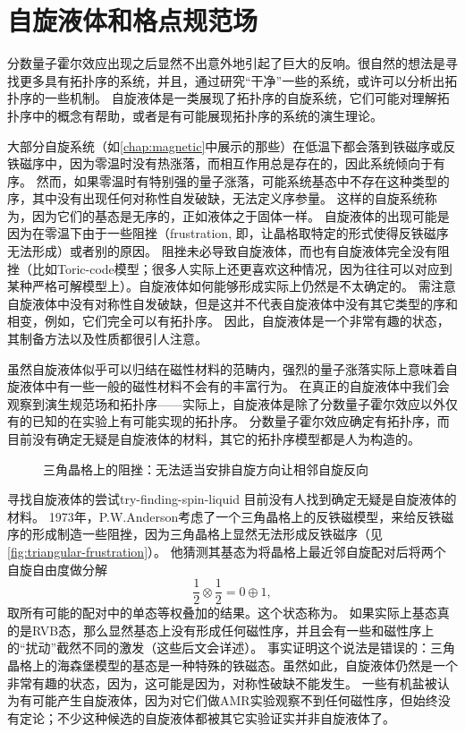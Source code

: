 \chapter{自旋液体和格点规范场}\label{chap:spin-liquid}

分数量子霍尔效应出现之后显然不出意外地引起了巨大的反响。很自然的想法是寻找更多具有拓扑序的系统，并且，通过研究“干净”一些的系统，或许可以分析出拓扑序的一些机制。
自旋液体是一类展现了拓扑序的自旋系统，它们可能对理解拓扑序中的概念有帮助，或者是有可能展现拓扑序的系统的演生理论。

大部分自旋系统（如\autoref{chap:magnetic}中展示的那些）在低温下都会落到铁磁序或反铁磁序中，因为零温时没有热涨落，而相互作用总是存在的，因此系统倾向于有序。
然而，如果零温时有特别强的量子涨落，可能系统基态中不存在这种类型的序，其中没有出现任何对称性自发破缺，无法定义序参量。
这样的自旋系统称为，因为它们的基态是无序的，正如液体之于固体一样。
自旋液体的出现可能是因为在零温下由于一些阻挫（frustration, 即，让晶格取特定的形式使得反铁磁序无法形成）或者别的原因。
阻挫未必导致自旋液体，而也有自旋液体完全没有阻挫（比如Toric-code模型；很多人实际上还更喜欢这种情况，因为往往可以对应到某种严格可解模型上）。自旋液体如何能够形成实际上仍然是不太确定的。
需注意自旋液体中没有对称性自发破缺，但是这并不代表自旋液体中没有其它类型的序和相变，例如，它们完全可以有拓扑序。
因此，自旋液体是一个非常有趣的状态，其制备方法以及性质都很引人注意。

虽然自旋液体似乎可以归结在磁性材料的范畴内，强烈的量子涨落实际上意味着自旋液体中有一些一般的磁性材料不会有的丰富行为。
在真正的自旋液体中我们会观察到演生规范场和拓扑序——实际上，自旋液体是除了分数量子霍尔效应以外仅有的已知的在实验上有可能实现的拓扑序。
分数量子霍尔效应确定有拓扑序，而目前没有确定无疑是自旋液体的材料，其它的拓扑序模型都是人为构造的。

\begin{figure}
    \centering
    
    \caption{三角晶格上的阻挫：无法适当安排自旋方向让相邻自旋反向}
    \label{fig:triangular-frustration}
\end{figure}

\begin{info}{寻找自旋液体的尝试}{try-finding-spin-liquid}
    目前没有人找到确定无疑是自旋液体的材料。
    1973年，P.W.Anderson考虑了一个三角晶格上的反铁磁模型，来给反铁磁序的形成制造一些阻挫，因为三角晶格上显然无法形成反铁磁序（见\autoref{fig:triangular-frustration}）。
    他猜测其基态为将晶格上最近邻自旋配对后将两个自旋自由度做分解
    \[
        \frac{1}{2} \otimes \frac{1}{2} = 0 \oplus 1,
    \]
    取所有可能的配对中的单态等权叠加的结果。这个状态称为。
    如果实际上基态真的是RVB态，那么显然基态上没有形成任何磁性序，并且会有一些和磁性序上的“扰动”截然不同的激发（这些后文会详述）。
    事实证明这个说法是错误的：三角晶格上的海森堡模型的基态是一种特殊的铁磁态。虽然如此，自旋液体仍然是一个非常有趣的状态，因为，这可能是因为，对称性破缺不能发生。
    一些有机盐被认为有可能产生自旋液体，因为对它们做AMR实验观察不到任何磁性序，但始终没有定论；不少这种候选的自旋液体都被其它实验证实并非自旋液体了。
\end{info}

